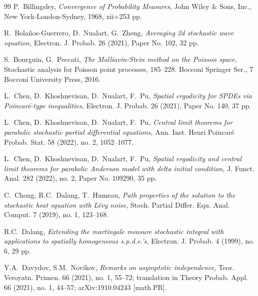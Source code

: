 \documentclass[letterpaper, 11pt,  reqno]{amsart}
\numberwithin{equation}{section}
\numberwithin{theorem}{section}
\begin{document}
\begin{thebibliography}{99}
P.~Billingsley,
{\em Convergence of Probability Measures},
John Wiley \& Sons, Inc., New York-London-Sydney, 1968, xii+253 pp. 
 



 R.~Bola\~nos-Guerrero, D.~Nualart, G.~Zheng,
 {\it Averaging 2d stochastic wave equation,}
  Electron. J. Probab.  26 (2021), Paper No. 102, 32 pp.
  
  
  S.~Bourguin, G.~Peccati, 
  {\it  The Malliavin-Stein method on the Poisson space,}
 Stochastic analysis for Poisson point processes, 185--228.
Bocconi Springer Ser., 7
Bocconi University Press, 2016.


 
 

L.~Chen,  D.~Khoshnevisan, D.~Nualart, F.~Pu,
{\it  Spatial ergodicity for SPDEs via Poincar\'e-type inequalities,}
Electron. J. Probab. 26 (2021), Paper No. 140, 37 pp.




L.~Chen, D.~Khoshnevisan,  D.~Nualart,  F.~Pu,
{\it  Central limit theorems for parabolic stochastic partial differential equations,}
 Ann. Inst. Henri Poincar\'e Probab. Stat. 58 (2022), no. 2, 1052--1077.




L.~Chen, D.~Khoshnevisan,  D.~Nualart,  F.~Pu,
{\it Spatial ergodicity and central limit theorems for parabolic Anderson model
with delta initial condition,}
J. Funct. Anal. 282 (2022), no. 2, Paper No. 109290, 35 pp.

 


C.~Chong, R.C.~Dalang,    T.~Humeau,  
{\it Path properties of the solution to the stochastic heat equation with L\'evy noise,}
Stoch. Partial Differ. Equ. Anal. Comput. 7 (2019), no. 1, 123--168.




R.C.~Dalang, 
{\it Extending the martingale measure stochastic integral with applications
to spatially homogeneous s.p.d.e.'s,}
Electron. J. Probab. 4 (1999), no. 6, 29 pp.
 


Y.A.~Davydov, S.M.~Novikov,    
{\it Remarks on asymptotic independence,}
Teor. Veroyatn. Primen. 66 (2021), no. 1, 55--72;
translation in Theory Probab. Appl. 66 (2021), no. 1, 44--57;
arXiv:1910.04243 [math.PR].



\end{thebibliography}
\end{document}
